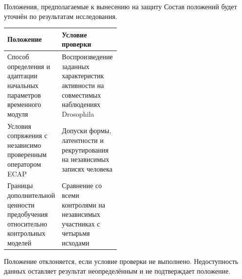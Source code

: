 \begin{frame}{Положения, предполагаемые к вынесению на защиту}
Состав положений будет уточнён по результатам исследования.
\SlideGap
{}
\begin{tabularx}{\linewidth}{|L{0.46\linewidth}|Y|}
\hline Положение & Условие проверки \\\hline
Способ определения и адаптации начальных параметров временного модуля & Воспроизведение заданных характеристик активности на совместимых наблюдениях Drosophila \\\hline
Условия сопряжения с независимо проверенным оператором ECAP & Допуски формы, латентности и рекрутирования на независимых записях человека \\\hline
Границы дополнительной ценности предобучения относительно контрольных моделей & Сравнение со всеми контролями на независимых участниках с четырьмя исходами \\\hline
\end{tabularx}
\SlideGap
Положение отклоняется, если условие проверки не выполнено. Недоступность данных оставляет результат неопределённым и не подтверждает положение.
\end{frame}
